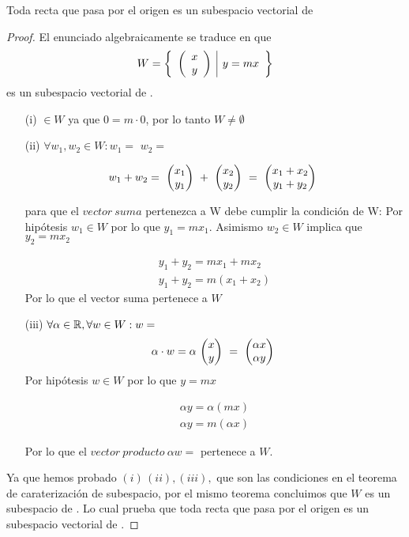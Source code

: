 \begin{theorem}
 Toda recta que pasa por el origen es un subespacio vectorial de \rdos

\end{theorem}
\begin{proof}

El enunciado algebraicamente se traduce en que $$W= \left\{\begin{array}{c|c} {\left( \begin{array}{c} x\\ y \end{array}\right) }&{y=mx} \end{array} \right\}$$
es un subespacio vectorial de \rdos.
\begin{enumerate}


\item[(i)]  $\in W$ ya que $0=m\cdot 0$, por lo tanto $W\neq \emptyset$ 

\item[(ii)] $\forall w_1, w_2 \in W: w_1=$ 
 $w_2=$

\[
w_1+w_2=\mbox{ \ensuremath{\begin{pmatrix} x_1\\ y_1\\ \end{pmatrix} } }+\mbox{ \ensuremath{\begin{pmatrix} x_2\\ y_2\\ \end{pmatrix} } }=
\mbox{ \ensuremath{\begin{pmatrix} x_1+x_2\\ y_1+y_2\\ \end{pmatrix} } }
\]

para que el $vector\ suma$ pertenezca a W debe cumplir la condici{\'o}n de W:
Por hip{\'o}tesis $w_1 \in W $ por lo que $y_1=mx_1$. Asimismo $w_2 \in W$ implica que
$y_2=mx_2$

\[
\begin{array}{c}

y_1+y_2=mx_1+mx_2
\\
y_1+y_2=m\left(x_1+x_2\right)
\end{array}
\]
Por lo que el vector suma pertenece a $W$

\item[(iii)] $\forall \alpha \in \mbox{\ensuremath{\mathbb{R}}}, \forall w \in W: w=$
\[
\alpha\cdot w=\alpha\mbox{ \ensuremath{\begin{pmatrix} x\\ y\\ \end{pmatrix} } }=
\mbox{ \ensuremath{\begin{pmatrix} \alpha x\\ \alpha y\\ \end{pmatrix} } }
\]
Por hip\'otesis $w\in W$ por lo que $y=mx$

\[\begin{array}{c}
\alpha y=\alpha\left(mx\right)
\\
\alpha y=m\left( \alpha x\right)
\end{array}
\]

Por lo que el $vector\ producto\ \alpha w=$ pertenece a $W$.

\end{enumerate}
Ya que hemos probado $\left( i\right)\, \left(ii\right), \left(iii\right),$ que son las condiciones en el teorema de caraterizaci\'on de subespacio, por el mismo teorema concluimos que $W$ es un subespacio de \rdos. Lo cual prueba que toda recta que pasa por el origen es un subespacio vectorial de \rdos.

\end{proof}


